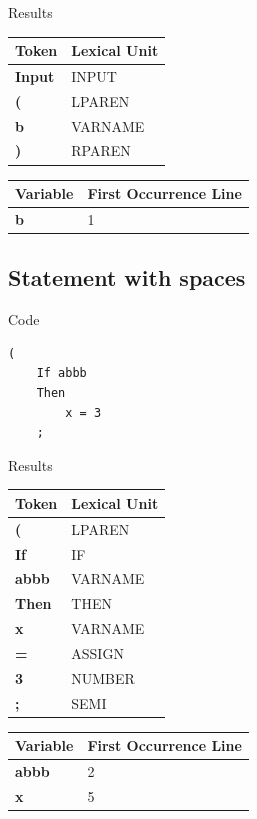 \documentclass{article}
\begin{document}
\begin{resultbox}{Results}
\begin{tabularx}{\linewidth}{|>{\bfseries}X|X|}
\toprule
Token & Lexical Unit \\
\midrule
Input & INPUT \\
( & LPAREN \\
b & VARNAME \\
) & RPAREN \\
\bottomrule
\end{tabularx}

\vspace{2em}

\begin{tabularx}{\linewidth}{|>{\bfseries}X|X|}
\toprule
Variable & First Occurrence Line \\
\midrule
b & 1 \\
\bottomrule
\end{tabularx}
\end{resultbox}

\subsection{Statement with spaces}

\begin{resultbox}{Code}
\begin{lstlisting}[style=yalccstyle]
(
    If abbb
    Then
        x = 3
    ;
\end{lstlisting}
\end{resultbox}

\begin{resultbox}{Results}
\begin{tabularx}{\linewidth}{|>{\bfseries}X|X|}
\toprule
Token & Lexical Unit \\
\midrule
( & LPAREN \\
If & IF \\
abbb & VARNAME \\
Then & THEN \\
x & VARNAME \\
= & ASSIGN \\
3 & NUMBER \\
; & SEMI \\
\bottomrule
\end{tabularx}

\vspace{2em}

\begin{tabularx}{\linewidth}{|>{\bfseries}X|X|}
\toprule
Variable & First Occurrence Line \\
\midrule
abbb & 2 \\
x & 5 \\
\bottomrule
\end{tabularx}
\end{resultbox}
\end{document}
